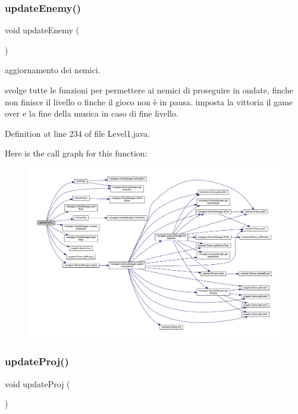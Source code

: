 \subsubsection{\texorpdfstring{update\+Enemy()}{updateEnemy()}}
{\footnotesize\ttfamily void update\+Enemy (\begin{DoxyParamCaption}{ }\end{DoxyParamCaption})}



aggiornamento dei nemici. 

svolge tutte le funzioni per permettere ai nemici di proseguire in ondate, finche non finisce il livello o finche il gioco non è in pausa. imposta la vittoria il game over e la fine della musica in caso di fine livello. 

Definition at line 234 of file Level1.\+java.

Here is the call graph for this function\+:\nopagebreak
\begin{figure}[H]
\begin{center}
\leavevmode
\includegraphics[width=350pt]{classscenes_1_1_level1_af005ec68c869a6acd5e833cba9330a50_cgraph}
\end{center}
\end{figure}
\mbox{\label{classscenes_1_1_level1_ac83c203b559f6fd0bb225744d7ccf854}} 
\subsubsection{\texorpdfstring{update\+Proj()}{updateProj()}}
{\footnotesize\ttfamily void update\+Proj (\begin{DoxyParamCaption}{ }\end{DoxyParamCaption})}



